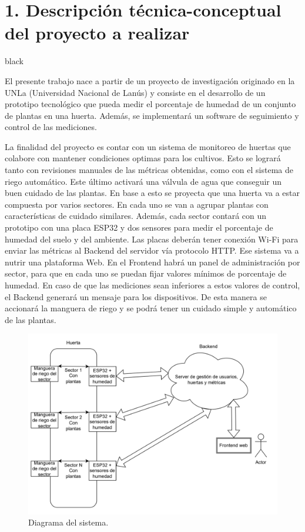 \documentclass[
11pt, %
codirector, %
]{charter}
\begin{document}
\section{1. Descripción técnica-conceptual del proyecto a realizar}
\label{sec:descripcion}


\begin{consigna}{black} %

El presente trabajo nace a partir de un proyecto de investigación originado en la UNLa (Universidad Nacional de Lanús) y consiste en el desarrollo de un prototipo tecnológico que pueda medir el porcentaje de humedad de un conjunto de plantas en una huerta. Además, se implementará un software de seguimiento y control de las mediciones.

La finalidad del proyecto es contar con un sistema de monitoreo de huertas que colabore con mantener condiciones optimas para los cultivos. Esto se logrará tanto con revisiones manuales de las métricas obtenidas, como con el sistema de riego automático. Este último activará una válvula de agua que conseguir un buen cuidado de las plantas.
En base a esto se proyecta que una huerta va a estar compuesta por varios sectores. En cada uno se van a agrupar plantas con características de cuidado similares. Además, cada sector contará con un prototipo con una placa ESP32 y dos sensores para medir el porcentaje de humedad del suelo y del ambiente. Las placas deberán tener conexión Wi-Fi para enviar las métricas al Backend del servidor vía protocolo HTTP. Ese sistema va a nutrir una plataforma Web. En el Frontend habrá un panel de administración por sector, para que en cada uno se puedan fijar valores mínimos de porcentaje de humedad. En caso de que las mediciones sean inferiores a estos valores de control, el Backend generará un mensaje para los dispositivos. De esta manera se accionará la manguera de riego y se podrá tener un cuidado simple y automático de las plantas.



\begin{figure}[htpb]
\centering 
\includegraphics[width=.9\textwidth]{./Figuras/diagBloques.png}
\caption{Diagrama del sistema.}
\label{fig:diagBloques}
\end{figure}


\end{consigna}
\end{document}
